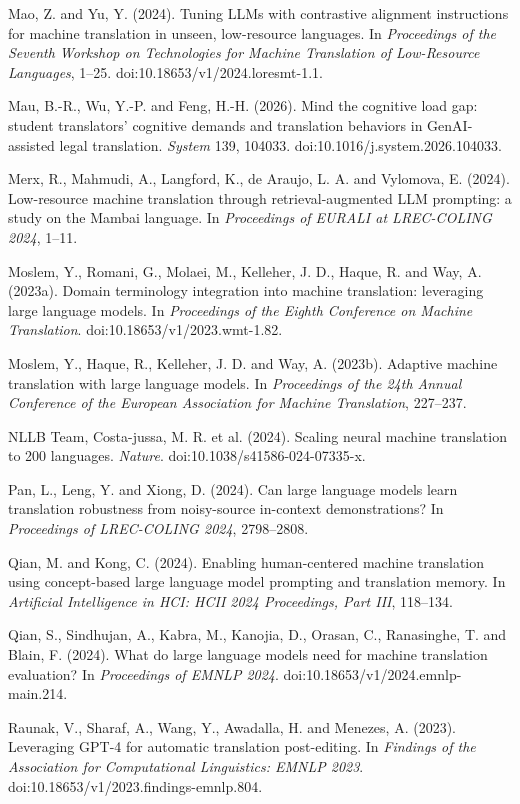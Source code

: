 \documentclass[11pt]{article}
\begin{document}
Mao, Z. and Yu, Y. (2024). Tuning LLMs with contrastive alignment instructions for machine translation in unseen, low-resource languages. In \emph{Proceedings of the Seventh Workshop on Technologies for Machine Translation of Low-Resource Languages}, 1--25. doi:10.18653/v1/2024.loresmt-1.1.

Mau, B.-R., Wu, Y.-P. and Feng, H.-H. (2026). Mind the cognitive load gap: student translators' cognitive demands and translation behaviors in GenAI-assisted legal translation. \emph{System} 139, 104033. doi:10.1016/j.system.2026.104033.

Merx, R., Mahmudi, A., Langford, K., de Araujo, L. A. and Vylomova, E. (2024). Low-resource machine translation through retrieval-augmented LLM prompting: a study on the Mambai language. In \emph{Proceedings of EURALI at LREC-COLING 2024}, 1--11.

Moslem, Y., Romani, G., Molaei, M., Kelleher, J. D., Haque, R. and Way, A. (2023a). Domain terminology integration into machine translation: leveraging large language models. In \emph{Proceedings of the Eighth Conference on Machine Translation}. doi:10.18653/v1/2023.wmt-1.82.

Moslem, Y., Haque, R., Kelleher, J. D. and Way, A. (2023b). Adaptive machine translation with large language models. In \emph{Proceedings of the 24th Annual Conference of the European Association for Machine Translation}, 227--237.

NLLB Team, Costa-jussa, M. R. et al. (2024). Scaling neural machine translation to 200 languages. \emph{Nature}. doi:10.1038/s41586-024-07335-x.

Pan, L., Leng, Y. and Xiong, D. (2024). Can large language models learn translation robustness from noisy-source in-context demonstrations? In \emph{Proceedings of LREC-COLING 2024}, 2798--2808.

Qian, M. and Kong, C. (2024). Enabling human-centered machine translation using concept-based large language model prompting and translation memory. In \emph{Artificial Intelligence in HCI: HCII 2024 Proceedings, Part III}, 118--134.

Qian, S., Sindhujan, A., Kabra, M., Kanojia, D., Orasan, C., Ranasinghe, T. and Blain, F. (2024). What do large language models need for machine translation evaluation? In \emph{Proceedings of EMNLP 2024}. doi:10.18653/v1/2024.emnlp-main.214.

Raunak, V., Sharaf, A., Wang, Y., Awadalla, H. and Menezes, A. (2023). Leveraging GPT-4 for automatic translation post-editing. In \emph{Findings of the Association for Computational Linguistics: EMNLP 2023}. doi:10.18653/v1/2023.findings-emnlp.804.
\end{document}
